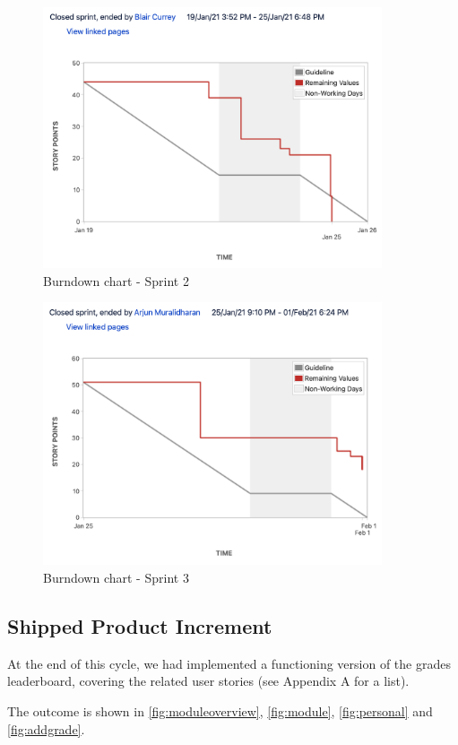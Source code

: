 \begin{figure}[H]
    \centering
    \includegraphics[width=10cm]{images/sprint2.png}
    \caption{Burndown chart - Sprint 2}
    \label{fig:sprint2}
\end{figure}

\begin{figure}[H]
    \centering
    \includegraphics[width=10cm]{images/sprint3.png}
    \caption{Burndown chart - Sprint 3}
    \label{fig:sprint3}
\end{figure}

\subsection{Shipped Product Increment}
At the end of this cycle, we had implemented a functioning version of the grades leaderboard, covering the related user stories (see Appendix A for a list). 

The outcome is shown in \cref{fig:moduleoverview}, \cref{fig:module}, \cref{fig:personal} and \cref{fig:addgrade}.

